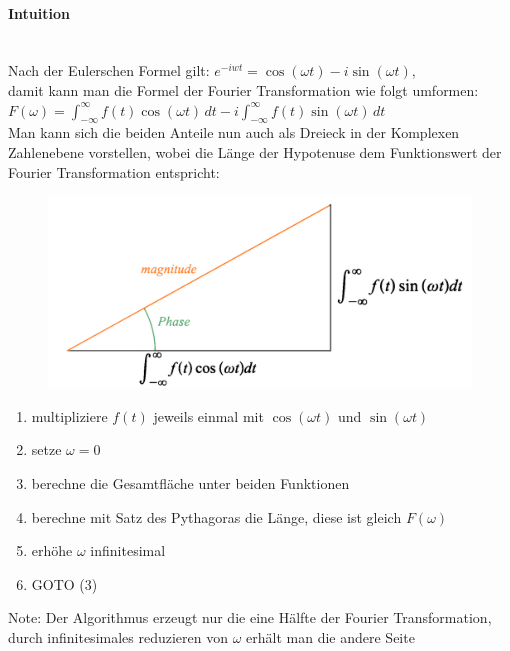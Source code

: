 \documentclass[12pt,a4paper]{article}
\newcommand{\nl}{\\[0.1cm]}
\begin{document}
\paragraph{Intuition}
\hspace{1pt}\\
Nach der Eulerschen Formel gilt: $e^{-iwt} = \cos(\omega t) - i\sin(\omega t)$,\\ damit kann man die Formel der Fourier Transformation wie folgt umformen:\nl
$\displaystyle F(\omega) = \int_{-\infty}^\infty f(t) \cos(\omega t)\,dt -i\int_{-\infty}^\infty f(t) \sin(\omega t)\,dt$\nl
Man kann sich die beiden Anteile nun auch als Dreieck in der Komplexen Zahlenebene vorstellen, wobei die Länge der Hypotenuse dem Funktionswert der Fourier Transformation entspricht:\nl
\begin{figure}[H]
\centering
\includegraphics[scale=0.2]{./resources/ft_dreieck.png}
\end{figure}
\begin{enumerate}
\item multipliziere $f(t)$ jeweils einmal mit $\cos(\omega t)$ und $\sin(\omega t)$
\item setze $\omega = 0$
\item berechne die Gesamtfläche unter beiden Funktionen
\item berechne mit Satz des Pythagoras die Länge, diese ist gleich $F(\omega)$
\item erhöhe $\omega$ infinitesimal
\item GOTO (3)
\end{enumerate}
Note: Der Algorithmus erzeugt nur die eine Hälfte der Fourier Transformation, durch infinitesimales reduzieren von $\omega$ erhält man die andere Seite\nl
\end{document}
